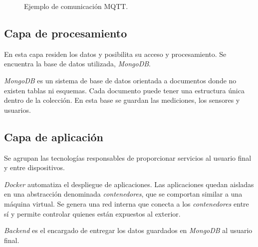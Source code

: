 			\begin{figure}[h]
				\centering
				\caption{Ejemplo de comunicación MQTT.}
				\label{fig:mqttEjemplo}
			\end{figure}
	
	\subsection{Capa de procesamiento}
	\label{capaProcesamiento}
	
		En esta capa residen los datos y posibilita su acceso y procesamiento. Se encuentra la base de datos utilizada, \emph{MongoDB}.
		
		\emph{MongoDB} es un sistema de base de datos orientada a documentos donde no existen tablas ni esquemas. Cada documento puede tener una estructura única dentro de la colección. En esta base se guardan las mediciones, los sensores y usuarios.
	
	\subsection{Capa de aplicación}
	\label{capaAplicacion}
	
		Se agrupan las tecnologías responsables de proporcionar servicios al usuario final y entre dispositivos.
		
		\emph{Docker} automatiza el despliegue de aplicaciones. Las aplicaciones quedan aisladas en una abstracción denominada \emph{contenedores}, que se comportan similar a una máquina virtual. Se genera una red interna que conecta a los \emph{contenedores} entre sí y permite controlar quienes están expuestos al exterior.
		
		\emph{Backend} es el encargado de entregar los datos guardados en \emph{MongoDB} al usuario final.
		
